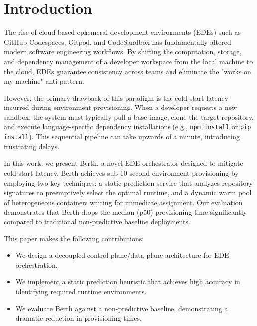 \section{Introduction}

The rise of cloud-based ephemeral development environments (EDEs) such as GitHub Codespaces, Gitpod, and CodeSandbox has fundamentally altered modern software engineering workflows. By shifting the computation, storage, and dependency management of a developer workspace from the local machine to the cloud, EDEs guarantee consistency across teams and eliminate the "works on my machine" anti-pattern.

However, the primary drawback of this paradigm is the cold-start latency incurred during environment provisioning. When a developer requests a new sandbox, the system must typically pull a base image, clone the target repository, and execute language-specific dependency installations (e.g., \texttt{npm install} or \texttt{pip install}). This sequential pipeline can take upwards of a minute, introducing frustrating delays.

In this work, we present Berth, a novel EDE orchestrator designed to mitigate cold-start latency. Berth achieves sub-10 second environment provisioning by employing two key techniques: a static prediction service that analyzes repository signatures to preemptively select the optimal runtime, and a dynamic warm pool of heterogeneous containers waiting for immediate assignment. Our evaluation demonstrates that Berth drops the median (p50) provisioning time significantly compared to traditional non-predictive baseline deployments. 

This paper makes the following contributions:
\begin{itemize}
    \item We design a decoupled control-plane/data-plane architecture for EDE orchestration.
    \item We implement a static prediction heuristic that achieves high accuracy in identifying required runtime environments.
    \item We evaluate Berth against a non-predictive baseline, demonstrating a dramatic reduction in provisioning times.
\end{itemize}
